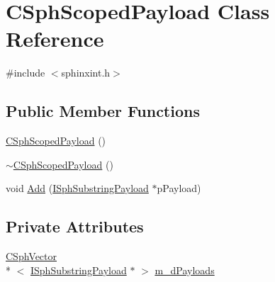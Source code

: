 \hypertarget{classCSphScopedPayload}{\section{C\-Sph\-Scoped\-Payload Class Reference}
\label{classCSphScopedPayload}
}


{\ttfamily \#include $<$sphinxint.\-h$>$}

\subsection*{Public Member Functions}
\begin{DoxyCompactItemize}
\item 
\hyperlink{classCSphScopedPayload_a72dbae382e1e92af79a57a095d75d3c5}{C\-Sph\-Scoped\-Payload} ()
\item 
\hyperlink{classCSphScopedPayload_a3c2b1147aa07f2e44fe8f3b48c05e88d}{$\sim$\-C\-Sph\-Scoped\-Payload} ()
\item 
void \hyperlink{classCSphScopedPayload_a66393821e318cba2b93228f458d65a21}{Add} (\hyperlink{structISphSubstringPayload}{I\-Sph\-Substring\-Payload} $\ast$p\-Payload)
\end{DoxyCompactItemize}
\subsection*{Private Attributes}
\begin{DoxyCompactItemize}
\item 
\hyperlink{classCSphVector}{C\-Sph\-Vector}\\*
$<$ \hyperlink{structISphSubstringPayload}{I\-Sph\-Substring\-Payload} $\ast$ $>$ \hyperlink{classCSphScopedPayload_a8a85e81ce7a963bbab7590e6e17f6602}{m\-\_\-d\-Payloads}
\end{DoxyCompactItemize}


